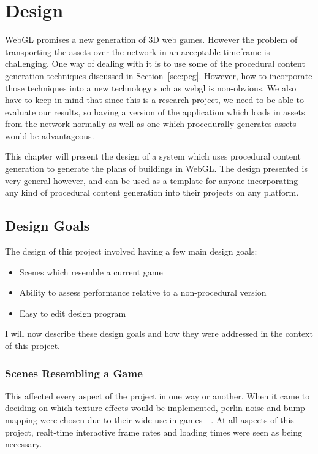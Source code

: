 \chapter{Design}
\label{ch:design}
WebGL promises a new generation of 3D web games.
However the problem of transporting the assets over the network in an acceptable timeframe is challenging.
One way of dealing with it is to use some of the procedural content generation techniques discussed in Section~\ref{sec:pcg}.
However, how to incorporate those techniques into a new technology such as webgl is non-obvious.
We also have to keep in mind that since this is a research project, we need to be able to evaluate our results, so having a version of the application which loads in assets from the network normally as well as one which procedurally generates assets would be advantageous.

This chapter will present the design of a system which uses procedural content generation to generate the plans of buildings in WebGL.
The design presented is very general however, and can be used as a template for anyone incorporating any kind of procedural content generation into their projects on any platform.

\section{Design Goals}
\label{sec:designgoals}
The design of this project involved having a few main design goals:
\begin{itemize}
    \item Scenes which resemble a current game
    \item Ability to assess performance relative to a non-procedural version
    \item Easy to edit design program
\end{itemize}

I will now describe these design goals and how they were addressed in the context of this project.

\subsection{Scenes Resembling a Game}

This affected every aspect of the project in one way or another.
When it came to deciding on which texture effects would be implemented, perlin noise and bump mapping were chosen due to their wide use in games~\cite{web:perlingames}~\cite{kilgard2000practical}.
At all aspects of this project, realt-time interactive frame rates and loading times were seen as being necessary.

